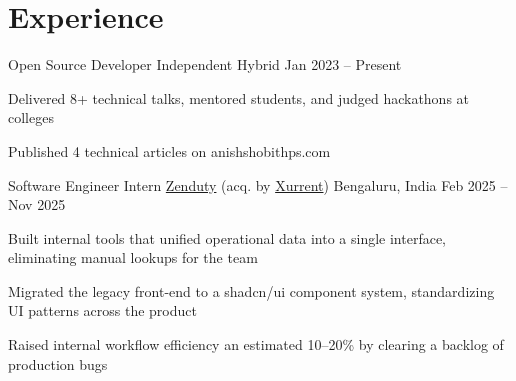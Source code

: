 \section*{Experience}

\experience
  {Open Source Developer}
  {Independent}
  {Hybrid}
  {Jan 2023 -- Present}
  {
    \item Delivered 8+ technical talks, mentored students, and judged hackathons at colleges
    \item Published 4 technical articles on anishshobithps.com
  }

\experience
  {Software Engineer Intern}
  {\href{https://www.zenduty.com/}{Zenduty} {\small(acq. by \href{https://www.xurrent.com/}{Xurrent})}}
  {Bengaluru, India}
  {Feb 2025 -- Nov 2025}
  {
    \item Built internal tools that unified operational data into a single interface, eliminating manual lookups for the team
    \item Migrated the legacy front-end to a shadcn/ui component system, standardizing UI patterns across the product
    \item Raised internal workflow efficiency an estimated 10--20\% by clearing a backlog of production bugs
  }
